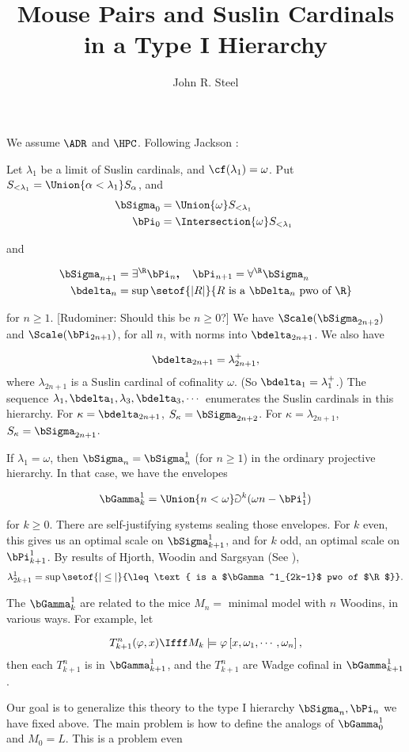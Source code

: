 \documentclass[oneside,12pt]{amsart}
\begin{document}
\title{Mouse Pairs and Suslin Cardinals in a Type I Hierarchy}
\author{John R. Steel}

\maketitle

We assume $\ADR$ and $\HPC$. Following Jackson \cite{Jackson1}:

Let $\lambda_1$ be a limit of Suslin cardinals, and $\cf(\lambda_1)=\omega$.
Put $S_{<\lambda_1} =\Union{\alpha<\lambda_1} S_{\alpha}$, and
\begin{align*}
\bSigma_0 &= \Union{\omega} S_{<\lambda_1} \\
\bPi_0 &= \Intersection{\omega} S_{<\lambda_1} \
\end{align*}

and

\begin{align*}
\bSigma_{n+1} &= \exists^{\R}\bPi_n \textbf{,\quad}
\bPi_{n+1} = \forall^{\R}\bSigma_n \\
\bdelta_n&=\sup\setof{|R|}{R\text{ is a }\bDelta_n\text{ pwo of } \R}
\end{align*}

for $n\geq 1$. [Rudominer: Should this be $n\geq 0$?]
We have $\Scale(\bSigma_{2n+2})$ and $\Scale(\bPi_{2n+1})$,
for all $n$, with norms into $\bdelta_{2n+1}$. We also have

$$ \bdelta_{2n+1} = \lambda_{2n+1}^+,$$
where $\lambda_{2n+1}$ is a Suslin cardinal of cofinality $\omega$.
(So $\bdelta_1=\lambda_1^+$.) The sequence $\lambda_1,\bdelta_1,\lambda_3,\bdelta_3,\cdots$
enumerates the Suslin cardinals in this hierarchy. For $\kappa=\bdelta_{2n+1}$,
$S_{\kappa}=\bSigma_{2n+2}$. For $\kappa=\lambda_{2n+1}$,
$S_{\kappa}=\bSigma_{2n+1}$.

If $\lambda_1=\omega$, then $\bSigma_n = \bSigma^1_n$ (for $n\geq 1$) in  the
ordinary projective hierarchy. In that case, we have the envelopes

$$
\bGamma^1_{k} = \Union{n<\omega} \Game^{k}(\omega n - \bPi^1_1)
$$

for $k\geq0$. There are self-justifying systems sealing those envelopes. For $k$ even, this gives us an optimal scale on $\bSigma^1_{k+1}$, and for $k$ odd, an optimal scale on $\bPi^1_{k+1}$. By results of
Hjorth, Woodin and Sargsyan (See \cite{Sargsyan1}),
$$
\lambda^1_{2k+1} = \sup\setof{|\leq|}{\leq\text{ is a $\bGamma^1_{2k-1}$ pwo of $\R$}}.
$$

The $\bGamma^1_{k}$ are related to the mice $M_n = $ minimal model with $n$ Woodins, in various ways. For example, let

$$
T^n_{k+1}(\varphi,x) \Ifff M_k \models \varphi\left[ x,\omega_1,\cdots,\omega_n\right],
$$
then each $T^n_{k+1}$ is in $\bGamma^1_{k+1}$, and the  $T^n_{k+1}$ are Wadge cofinal in
$\bGamma^1_{k+1}$.

Our goal is to generalize this theory to the type I hierarchy $\bSigma_n,\bPi_n$ we have
fixed above. The main problem is how to define the analogs of $\bGamma^1_{0}$ and
$M_0=L$. This is a problem even




\end{document}
